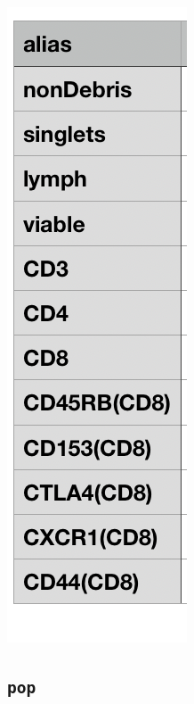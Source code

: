 \documentclass[]{book}
\begin{document}
\includegraphics[width=0.6\linewidth]{./tutorial/images/alias}

\hypertarget{pop}{%
\subsection{\texorpdfstring{\texttt{pop}}{pop}}\label{pop}}
\end{document}
